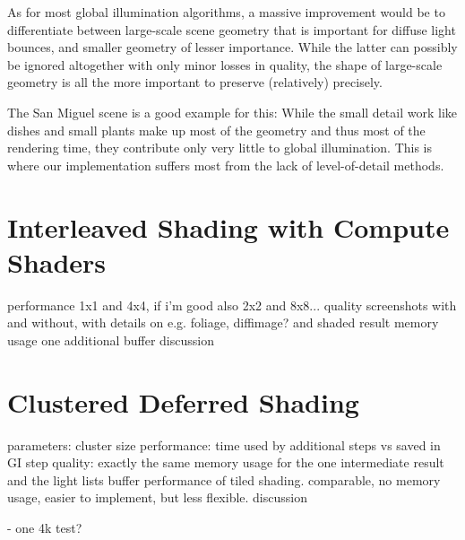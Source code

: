 As for most global illumination algorithms, a massive improvement would be to differentiate between large-scale scene geometry that is important for diffuse light bounces, and smaller geometry of lesser importance. While the latter can possibly be ignored altogether with only minor losses in quality, the shape of large-scale geometry is all the more important to preserve (relatively) precisely.

The San Miguel scene is a good example for this: While the small detail work like dishes and small plants make up most of the geometry and thus most of the rendering time, they contribute only very little to global illumination. This is where our implementation suffers most from the lack of level-of-detail methods.




\section{Interleaved Shading with Compute Shaders}
\label{sec:results:interleavedShading}

\begin{outline}
\1 performance
\1 1x1 and 4x4, if i'm good also 2x2 and 8x8...
\1 quality
    \2 screenshots with and without, with details on e.g. foliage, diffimage? and shaded result
\1 memory usage
    \2 one additional buffer
\1 discussion

\end{outline}



\section{Clustered Deferred Shading}
\label{sec:results:clusteredShading}

\begin{outline}
\1 parameters: cluster size
\1 performance: time used by additional steps vs saved in GI step
\1 quality: exactly the same
\1 memory usage for the one intermediate result and the light lists buffer
\1 performance of tiled shading. comparable, no memory usage, easier to implement, but less flexible.
\1 discussion
\end{outline}




- one 4k test?
